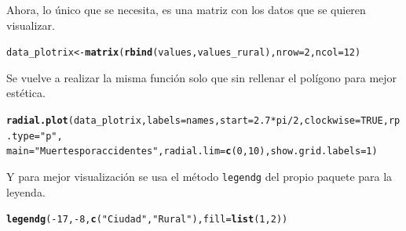 \documentclass{article}\usepackage[]{graphicx}\usepackage[]{color}
\makeatletter
\newcommand{\hlnum}[1]{\textcolor[rgb]{0.686,0.059,0.569}{#1}}%
\newcommand{\hlstr}[1]{\textcolor[rgb]{0.192,0.494,0.8}{#1}}%
\newcommand{\hlopt}[1]{\textcolor[rgb]{0,0,0}{#1}}%
\newcommand{\hlstd}[1]{\textcolor[rgb]{0.345,0.345,0.345}{#1}}%
\newcommand{\hlkwb}[1]{\textcolor[rgb]{0.69,0.353,0.396}{#1}}%
\newcommand{\hlkwc}[1]{\textcolor[rgb]{0.333,0.667,0.333}{#1}}%
\newcommand{\hlkwd}[1]{\textcolor[rgb]{0.737,0.353,0.396}{\textbf{#1}}}%
\newenvironment{kframe}{%
 \def\at@end@of@kframe{}%
 \ifinner\ifhmode%
  \def\at@end@of@kframe{\end{minipage}}%
  \begin{minipage}{\columnwidth}%
 \fi\fi%
 \def\FrameCommand##1{\hskip\@totalleftmargin \hskip-\fboxsep
 \colorbox{shadecolor}{##1}\hskip-\fboxsep
     \hskip-\linewidth \hskip-\@totalleftmargin \hskip\columnwidth}%
 \MakeFramed {\advance\hsize-\width
   \@totalleftmargin\z@ \linewidth\hsize
   \@setminipage}}%
 {\par\unskip\endMakeFramed%
 \at@end@of@kframe}
\newenvironment{knitrout}{}{} %
\makeatother
\begin{document}
Ahora, lo \'unico que se necesita, es una matriz con los datos que se quieren visualizar.
\begin{knitrout}
\color{fgcolor}\begin{kframe}
\begin{alltt}
\hlstd{data_plotrix} \hlkwb{<-} \hlkwd{matrix}\hlstd{(}\hlkwd{rbind}\hlstd{(values, values_rural),} \hlkwc{nrow} \hlstd{=} \hlnum{2}\hlstd{,} \hlkwc{ncol} \hlstd{=} \hlnum{12}\hlstd{)}
\end{alltt}
\end{kframe}
\end{knitrout}
Se vuelve a realizar la misma funci\'on solo que sin rellenar el pol\'igono para mejor est\'etica.
\begin{knitrout}
\color{fgcolor}\begin{kframe}
\begin{alltt}
\hlkwd{radial.plot}\hlstd{(data_plotrix,}\hlkwc{labels}\hlstd{=names,} \hlkwc{start} \hlstd{=} \hlnum{2.7}\hlopt{*}\hlstd{pi}\hlopt{/}\hlnum{2}\hlstd{,} \hlkwc{clockwise} \hlstd{=} \hlnum{TRUE}\hlstd{,}\hlkwc{rp.type}\hlstd{=}\hlstr{"p"}\hlstd{,}
            \hlkwc{main}\hlstd{=}\hlstr{"Muertes por accidentes"}\hlstd{,}\hlkwc{radial.lim}\hlstd{=}\hlkwd{c}\hlstd{(}\hlnum{0}\hlstd{,}\hlnum{10}\hlstd{),}\hlkwc{show.grid.labels}\hlstd{=}\hlnum{1}\hlstd{)}
\end{alltt}
\end{kframe}
\end{knitrout}
Y para mejor visualizaci\'on se usa el m\'etodo \texttt{legendg} del propio paquete para la leyenda.
\begin{knitrout}
\color{fgcolor}\begin{kframe}
\begin{alltt}
\hlkwd{legendg}\hlstd{(}\hlopt{-}\hlnum{17}\hlstd{,}\hlopt{-}\hlnum{8}\hlstd{,}\hlkwd{c}\hlstd{(}\hlstr{"Ciudad"}\hlstd{,}\hlstr{"Rural"}\hlstd{),}\hlkwc{fill}\hlstd{=}\hlkwd{list}\hlstd{(}\hlnum{1}\hlstd{,}\hlnum{2}\hlstd{))}
\end{alltt}
\end{kframe}
\end{knitrout}
\end{document}
